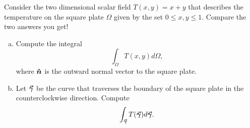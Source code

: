 \documentclass[12pt]{article} %
\begin{document}
\begin{problem}
Consider the two dimensional scalar field $T(x,y)=x+y$ that describes the temperature on the square plate $\Omega$ given by the set $0\leq x,y \leq 1$.  Compare the two answers you get!
\begin{enumerate}[(a)]
	\item Compute the integral
	\[
	\int_\Omega T(x,y)d\Omega,
	\]
	where $\boldsymbol{\hat{n}}$ is the outward normal vector to the square plate.
	\item Let $\boldsymbol{\vec{\gamma}}$ be the curve that traverses the boundary of the square plate in the counterclockwise direction.  Compute
	\[
	\int_{\boldsymbol{\vec{\gamma}}} T(\boldsymbol{\vec{\gamma}})d\boldsymbol{\vec{\gamma}}. 
	\]
\end{enumerate}
\end{problem}
\end{document}
